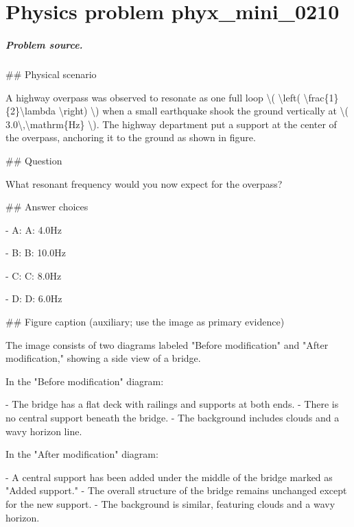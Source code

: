 
\chapter{Physics problem phyx\_mini\_0210}
\label{ch:PhyXMiniProblems_problem_phyx_mini_0210}

\paragraph{Problem source.}
\#\# Physical scenario

A highway overpass was observed to resonate as one full loop \textbackslash{}( \textbackslash{}left( \textbackslash{}frac\{1\}\{2\}\textbackslash{}lambda \textbackslash{}right) \textbackslash{}) when a small earthquake shook the ground vertically at \textbackslash{}( 3.0\textbackslash{},\textbackslash{}mathrm\{Hz\} \textbackslash{}). The highway department put a support at the center of the overpass, anchoring it to the ground as shown in figure.

\#\# Question

What resonant frequency would you now expect for the overpass?

\#\# Answer choices

- A: A: 4.0Hz

- B: B: 10.0Hz

- C: C: 8.0Hz

- D: D: 6.0Hz

\#\# Figure caption (auxiliary; use the image as primary evidence)

The image consists of two diagrams labeled "Before modification" and "After modification," showing a side view of a bridge. 

In the "Before modification" diagram:

- The bridge has a flat deck with railings and supports at both ends.
- There is no central support beneath the bridge.
- The background includes clouds and a wavy horizon line.

In the "After modification" diagram:

- A central support has been added under the middle of the bridge marked as "Added support."
- The overall structure of the bridge remains unchanged except for the new support.
- The background is similar, featuring clouds and a wavy horizon.

